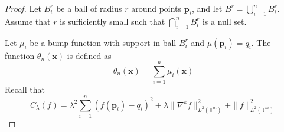 \documentclass[multixcb]{amstext-l}
\theoremstyle{plain}
\theoremstyle{definition}
\theoremstyle{definition}
\theoremstyle{remark}
\numberwithin{equation}{chapter}
\begin{document}
\begin{proof}
Let $B^r_i$ be a ball of radius $r$ around points $\boldsymbol{p}_i$, and let $B^r = \bigcup\limits_{i = 1}^nB^r_i$. Assume that $r$ is sufficiently small such that $\bigcap\limits_{i = 1}^nB^r_i$ is a null set.

Let $\mu_i$ be a bump function with support in ball $B_i^r$ and $\mu(\boldsymbol{p}_i) = q_i$. The function $\theta_n(\boldsymbol{x})$ is defined as
\begin{equation}\label{eq37}
\theta_n(\boldsymbol{x}) = \sum\limits_{i = 1}^{n} \mu_i(\boldsymbol{x})    
\end{equation}
Recall that
\begin{equation}\label{eq38}
C_{\lambda}(f) = \lambda^2\sum\limits_{i=1}^{n}(f(\boldsymbol{p}_i)-q_i)^2 + \lambda\|\nabla^kf\|_{L^2(\mathbb{T}^m)}^2 + \|f\|_{L^2(\mathbb{T}^m)}^2
\end{equation}


\end{proof}
\end{document}
